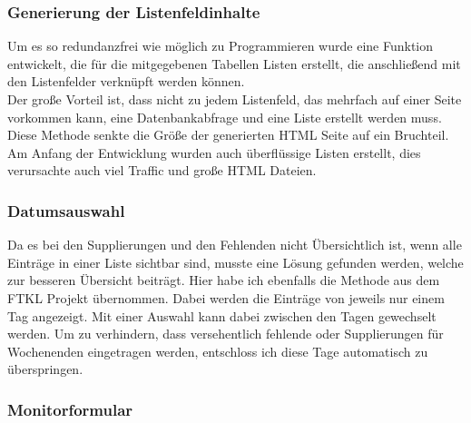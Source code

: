 \subsubsection{Generierung der Listenfeldinhalte}
Um es so redundanzfrei wie möglich zu Programmieren wurde eine Funktion entwickelt, die für die mitgegebenen Tabellen Listen erstellt, die anschließend mit den Listenfelder verknüpft werden können.\\
Der große Vorteil ist, dass nicht zu jedem Listenfeld, das mehrfach auf einer Seite vorkommen kann, eine Datenbankabfrage und eine Liste erstellt werden muss. Diese Methode senkte die Größe der generierten HTML Seite auf ein Bruchteil. Am Anfang der Entwicklung wurden auch überflüssige Listen erstellt, dies verursachte auch viel Traffic und große HTML Dateien.
\subsubsection{Datumsauswahl}
Da es bei den Supplierungen und den Fehlenden nicht Übersichtlich ist, wenn alle Einträge in einer Liste sichtbar sind, musste eine Lösung gefunden werden, welche zur besseren Übersicht beiträgt. Hier habe ich ebenfalls die Methode aus dem FTKL Projekt übernommen. Dabei werden die Einträge von jeweils nur einem Tag angezeigt. Mit einer Auswahl kann dabei zwischen den Tagen gewechselt werden. Um zu verhindern, dass versehentlich fehlende oder Supplierungen für Wochenenden eingetragen werden, entschloss ich diese Tage automatisch zu überspringen.
\subsubsection{Monitorformular}
